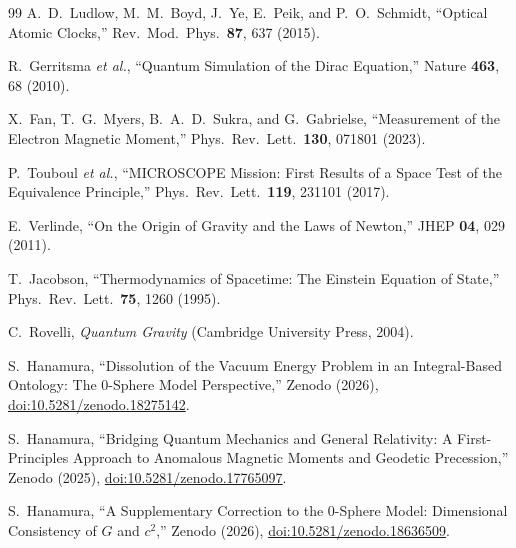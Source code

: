 \documentclass[%
 reprint,
 amsmath,amssymb,
 aps,
 prb,
]{revtex4-2}
\numberwithin{equation}{section}
\begin{document}
\begin{thebibliography}{99}
A.~D.~Ludlow, M.~M.~Boyd, J.~Ye, E.~Peik, and P.~O.~Schmidt,
``Optical Atomic Clocks,''
Rev.\ Mod.\ Phys.\ \textbf{87}, 637 (2015).

R.~Gerritsma \emph{et al.},
``Quantum Simulation of the Dirac Equation,''
Nature \textbf{463}, 68 (2010).

X.~Fan, T.~G.~Myers, B.~A.~D.~Sukra, and G.~Gabrielse,
``Measurement of the Electron Magnetic Moment,''
Phys.\ Rev.\ Lett.\ \textbf{130}, 071801 (2023).

P.~Touboul \emph{et al.},
``MICROSCOPE Mission: First Results of a Space Test of the Equivalence Principle,''
Phys.\ Rev.\ Lett.\ \textbf{119}, 231101 (2017).

E.~Verlinde,
``On the Origin of Gravity and the Laws of Newton,''
JHEP \textbf{04}, 029 (2011).

T.~Jacobson,
``Thermodynamics of Spacetime: The Einstein Equation of State,''
Phys.\ Rev.\ Lett.\ \textbf{75}, 1260 (1995).

C.~Rovelli,
\emph{Quantum Gravity} (Cambridge University Press, 2004).

S.~Hanamura,
``Dissolution of the Vacuum Energy Problem in an Integral-Based Ontology: The 0-Sphere Model Perspective,''
Zenodo (2026), \href{https://doi.org/10.5281/zenodo.18275142}{doi:10.5281/zenodo.18275142}.

S.~Hanamura,
``Bridging Quantum Mechanics and General Relativity: A First-Principles Approach to Anomalous Magnetic Moments and Geodetic Precession,''
Zenodo (2025), \href{https://doi.org/10.5281/zenodo.17765097}{doi:10.5281/zenodo.17765097}.

S.~Hanamura,
``A Supplementary Correction to the 0-Sphere Model: Dimensional Consistency of $G$ and $c^2$,''
Zenodo (2026), \href{https://doi.org/10.5281/zenodo.18636509}{doi:10.5281/zenodo.18636509}.

\end{thebibliography}

\end{document}
